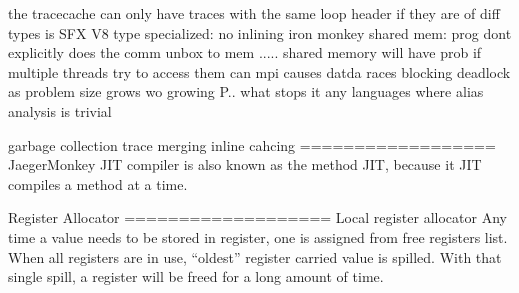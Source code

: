 the tracecache can only have traces with the same loop header if they are of diff types
is SFX V8 type specialized: no
inlining
iron monkey
shared mem: prog dont explicitly does the comm
unbox to mem ..... shared memory will have prob if multiple threads try to access them
can mpi causes datda races
blocking deadlock
as problem size grows wo growing P.. what stops it
any languages where alias analysis is trivial

garbage collection          
trace merging
inline cahcing
==================
JaegerMonkey JIT compiler is also known as the method JIT, because it JIT
compiles a method at a time.

Register Allocator
===================
Local register allocator
Any time a value needs to be stored in register, one is assigned from free registers list. 
When all registers are in use, ``oldest'' register carried value is spilled.
With that single spill, a register will be freed for a long amount of time.
